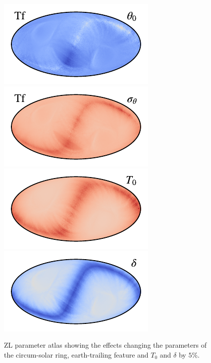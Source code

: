 \documentclass{aa}
\begin{document}
\begin{figure}
    \includegraphics[width=.23\textwidth]{figs/atlas/TF_10.pdf}
    \includegraphics[width=.23\textwidth]{figs/atlas/TF_11.pdf}\\
    \includegraphics[width=.23\textwidth]{figs/atlas/general_01.pdf}
    \includegraphics[width=.23\textwidth]{figs/atlas/general_02.pdf}\hspace*{0.5\textwidth}
    \caption{ZL parameter atlas showing the effects changing the parameters of the circum-solar ring, earth-trailing feature and $T_0$ and $\delta$ by $5\%$.}
    \label{fig:atlas2}
\end{figure}
\end{document}
